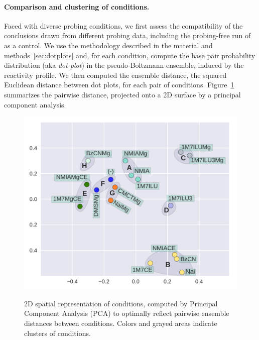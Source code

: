 \documentclass[a4,center,fleqn]{NAR}
\begin{document}
\paragraph{Comparison and clustering of conditions.}
Faced with diverse probing conditions, we first assess the compatibility of the conclusions drawn from different probing data, including the probing-free run of \OurTool as a control. We use the methodology described in the material and methods~\ref{sec:dotplots} and, for each condition, compute the base pair probability distribution (aka \emph{dot-plot}) in the  pseudo-Boltzmann ensemble, induced by the reactivity profile. We then computed the ensemble distance, the squared Euclidean distance between dot plots, for each pair of conditions. Figure~\ref{fig:PCA} summarizes the pairwise distance, projected onto a 2D surface by a principal component analysis.


\begin{figure}
	{\centering \includegraphics[width=\linewidth]{graphs/didy/PCA}\\}%
	
	\caption{2D spatial representation of conditions, computed by Principal Component Analysis (PCA) to optimally reflect pairwise ensemble distances between conditions. Colors and grayed areas indicate clusters of conditions.}\label{fig:PCA}
\end{figure}
\end{document}
